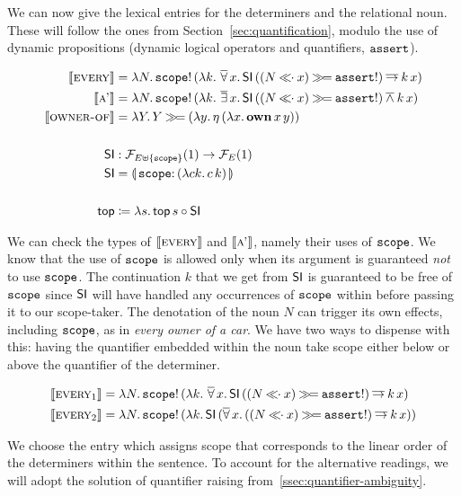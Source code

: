 We can now give the lexical entries for the determiners and the relational
noun. These will follow the ones from Section~\ref{sec:quantification},
modulo the use of dynamic propositions (dynamic logical operators and
quantifiers, $\mathtt{assert}$).

\begin{align*}
  \lex{every}{\lam{N}{\ap{\op{scope}!}{(\lam{k}{\dforall x.\,\ap{\SI}{((N \apl x) \hsbind \op{assert}!)} \dimp \ap{k}{x}})}}} \\
  \lex{a'}{\lam{N}{\ap{\op{scope}!}{(\lam{k}{\dexists x.\,\ap{\SI}{((N \apl x) \hsbind \op{assert}!)} \dand \ap{k}{x}})}}} \\
  \lex{owner-of}{\lam{Y}{Y \hsbind (\lam{y}{\etaE{(\lam{x}{\app{\obj{own}}{x}{y}})}})}} \\
  \\
  \SI &: \FF_{E \uplus \{\op{scope}\}}(1) \to \FF_E(1) \\
  \SI &= \banana{\onto{\op{scope}}{(\lam{c k}{\ap{c}{k}})}} \\
  \\
  \TOP &\coloneqq \lam{s}{\ap{\TOP}{s} \circ \SI}
\end{align*}

We can check the types of $\llbracket \textsc{every} \rrbracket$ and $\llbracket \textsc{a'} \rrbracket$, namely
their uses of $\mathtt{scope}$. We know that the use of $\mathtt{scope}$ is allowed
only when its argument is guaranteed \emph{not} to use $\mathtt{scope}$. The
continuation $k$ that we get from $\textsf{SI}$ is guaranteed to be free of
$\mathtt{scope}$ since $\textsf{SI}$ will have handled any occurrences of $\mathtt{scope}$
within before passing it to our scope-taker. The denotation of the noun $N$
can trigger its own effects, including $\mathtt{scope}$, as in \emph{every
  owner of a car}. We have two ways to dispense with this: having the
quantifier embedded within the noun take scope either below or above the
quantifier of the determiner.

\begin{align*}
  \llbracket \textsc{every}_1 \rrbracket &= \lambda N.\, \mathtt{scope}!\,(\lambda k.\, \mathop{\overline{\forall}} x.\,\textsf{SI}\,((N \mathbin{\ll\!\!\cdot} x) \mathbin{\gg\!=} \mathtt{assert}!) \mathbin{\overline{\to}} k\,x) \\
  \llbracket \textsc{every}_2 \rrbracket &= \lambda N.\, \mathtt{scope}!\,(\lambda k.\, \textsf{SI}\,(\mathop{\overline{\forall}} x.\,((N \mathbin{\ll\!\!\cdot} x) \mathbin{\gg\!=} \mathtt{assert}!) \mathbin{\overline{\to}} k\,x))
\end{align*}

We choose the entry which assigns scope that corresponds to the linear
order of the determiners within the sentence. To account for the
alternative readings, we will adopt the solution of quantifier raising
from~\ref{ssec:quantifier-ambiguity}.

